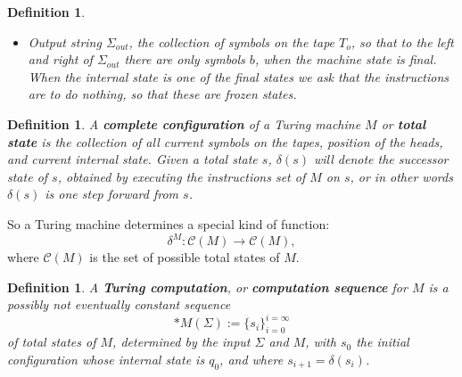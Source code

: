 \documentclass{amsart}  %
\numberwithin{equation}{section}
\newtheorem{definition}[equation]{Definition}
\theoremstyle{definition}
\theoremstyle{remark}
\begin{document}
{\begin{definition}
\begin{itemize}
\begin{enumerate} \label{enumerate}
   \item Replace symbols with another symbol in the cells to which the heads $H _{c}, H _{o}  $ point (or leave them).
   \item Move each head $H _{i}, H _{c}, H _{o}   $ left, right, or leave it in place, (independently).
   \item Change state $q$ to another state or keep it.
\end{enumerate}
\item Output string $\Sigma _{out} $,  the collection of symbols on the tape $T _{o} $, so that to the left and right of $\Sigma _{out} $ there are only symbols $b$, when the machine state is final. When the internal state is one of the final states we ask that the instructions are to do nothing, so that these are frozen states.  
  \end{itemize} 
\end{definition}
\begin{definition} A \textbf{\emph{complete configuration}} of a Turing machine $M$ or \textbf{\emph{total state}} is the collection of all current symbols on the tapes, position of the heads, and current internal state. Given a total state $s$, $\delta (s)$ will denote the successor state of $s$, obtained by executing the instructions set of $M$ on $s$, or in other words $\delta(s)  $ is one step forward from $s$.
\end{definition}
So a Turing machine determines a special kind of function:
\begin{equation*}
\delta ^{M} : \mathcal{C} (M)  \to \mathcal{C} (M),
\end{equation*}
where $\mathcal{C} (M)$ is the set of possible total states of $M$. 
\begin{definition}
   A \textbf{\emph{Turing computation}}, or \textbf{\emph{computation sequence}} for $M$ is a possibly not eventually constant sequence $$*M (\Sigma):= \{s _{i} \} _{i=0} ^{i=\infty} $$  of total states of $M$,  determined by the input $\Sigma$ and $M$,  with $s _{0}  $ the initial configuration whose internal state is $q _{0} $, and where $s _{i+1} = \delta (s _{i} ) $.

\end{definition}}
\end{document}

